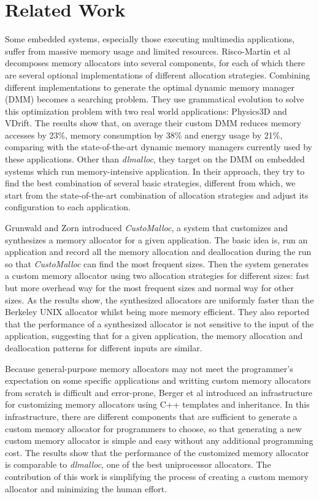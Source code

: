 \section{Related Work}

Some embedded systems, especially those executing multimedia applications, suffer from massive memory usage and limited resources. Risco-Martin et al\cite{Risco-Martin:2009:ODM:1569901.1570116}\cite{RiscoMartin2010572} decomposes memory allocators into several components, for each of which there are several optional implementations of different allocation strategies. Combining different implementations to generate the optimal dynamic memory manager (DMM) becomes a searching problem. They use grammatical evolution to solve this optimization problem with two real world applications: Physics3D and VDrift. The results show that, on average their custom DMM reduces memory accesses by 23\%, memory consumption by 38\% and energy usage by 21\%, comparing with the state-of-the-art dynamic memory managers currently used by these applications. Other than \emph{dlmalloc}, they target on the DMM on embedded systems which run memory-intensive application. In their approach, they try to find the best combination of several basic strategies, different from which, we start from the state-of-the-art combination of allocation strategies and adjust its configuration to each application. 

Grunwald and Zorn introduced \emph{CustoMalloc}, a system that customizes and synthesizes a memory allocator for a given application\cite{SPE:SPE4380230804}. The basic idea is, run an application and record all the memory allocation and deallocation during the run so that \emph{CustoMalloc} can find the most frequent sizes. Then the system generates a custom memory allocator using two allocation strategies for different sizes: fast but more overhead way for the most frequent sizes and normal way for other sizes. As the results show, the synthesized allocators are uniformly faster than the Berkeley UNIX allocator whilst being more memory efficient. They also reported that the performance of a synthesized allocator is not sensitive to the input of the application, suggesting that for a given application, the memory allocation and deallocation patterns for different inputs are similar. 

Because general-purpose memory allocators may not meet the programmer's expectation on some specific applications and writting custom memory allocators from scratch is difficult and error-prone, Berger et al\cite{Berger:2001:CHM:381694.378821} introduced an infrastructure for customizing memory allocators using C++ templates and inheritance. In this infrastructure, there are different components that are sufficient to generate a custom memory allocator for programmers to choose, so that generating a new custom memory allocator is simple and easy without any additional programming cost. The results show that the performance of the customized memory allocator is comparable to \emph{dlmalloc}, one of the best uniprocessor allocators. The contribution of this work is simplifying the process of creating a custom memory allocator and minimizing the human effort.

